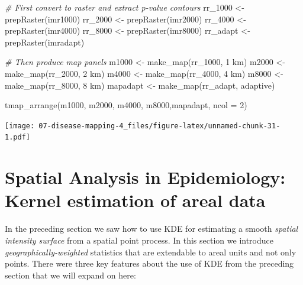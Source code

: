 \documentclass[
]{book}
\newenvironment{Shaded}{\begin{snugshade}}{\end{snugshade}}
\newcommand{\AttributeTok}[1]{\textcolor[rgb]{0.77,0.63,0.00}{#1}}
\newcommand{\CommentTok}[1]{\textcolor[rgb]{0.56,0.35,0.01}{\textit{#1}}}
\newcommand{\DecValTok}[1]{\textcolor[rgb]{0.00,0.00,0.81}{#1}}
\newcommand{\FunctionTok}[1]{\textcolor[rgb]{0.00,0.00,0.00}{#1}}
\newcommand{\NormalTok}[1]{#1}
\newcommand{\OtherTok}[1]{\textcolor[rgb]{0.56,0.35,0.01}{#1}}
\newcommand{\StringTok}[1]{\textcolor[rgb]{0.31,0.60,0.02}{#1}}
\begin{document}
\begin{Shaded}
\begin{Highlighting}[]
\CommentTok{\# First convert to raster and extract p{-}value contours}
\NormalTok{rr\_1000 }\OtherTok{\textless{}{-}} \FunctionTok{prepRaster}\NormalTok{(imr1000)}
\NormalTok{rr\_2000 }\OtherTok{\textless{}{-}} \FunctionTok{prepRaster}\NormalTok{(imr2000)}
\NormalTok{rr\_4000 }\OtherTok{\textless{}{-}} \FunctionTok{prepRaster}\NormalTok{(imr4000)}
\NormalTok{rr\_8000 }\OtherTok{\textless{}{-}} \FunctionTok{prepRaster}\NormalTok{(imr8000)}
\NormalTok{rr\_adapt }\OtherTok{\textless{}{-}} \FunctionTok{prepRaster}\NormalTok{(imradapt)}

\CommentTok{\# Then produce map panels}
\NormalTok{m1000 }\OtherTok{\textless{}{-}} \FunctionTok{make\_map}\NormalTok{(rr\_1000, }\StringTok{\textquotesingle{}1 km\textquotesingle{}}\NormalTok{)}
\NormalTok{m2000 }\OtherTok{\textless{}{-}} \FunctionTok{make\_map}\NormalTok{(rr\_2000, }\StringTok{\textquotesingle{}2 km\textquotesingle{}}\NormalTok{)}
\NormalTok{m4000 }\OtherTok{\textless{}{-}} \FunctionTok{make\_map}\NormalTok{(rr\_4000, }\StringTok{\textquotesingle{}4 km\textquotesingle{}}\NormalTok{)}
\NormalTok{m8000 }\OtherTok{\textless{}{-}} \FunctionTok{make\_map}\NormalTok{(rr\_8000, }\StringTok{\textquotesingle{}8 km\textquotesingle{}}\NormalTok{)}
\NormalTok{mapadapt }\OtherTok{\textless{}{-}} \FunctionTok{make\_map}\NormalTok{(rr\_adapt, }\StringTok{\textquotesingle{}adaptive\textquotesingle{}}\NormalTok{)}

\FunctionTok{tmap\_arrange}\NormalTok{(m1000, m2000, m4000, m8000,mapadapt, }\AttributeTok{ncol =} \DecValTok{2}\NormalTok{)}
\end{Highlighting}
\end{Shaded}

\texttt{[image: 07-disease-mapping-4\_files/figure-latex/unnamed-chunk-31-1.pdf]}

\hypertarget{gwss}{%
\section{Spatial Analysis in Epidemiology: Kernel estimation of areal data}\label{gwss}}

In the preceding section we saw how to use KDE for estimating a smooth \emph{spatial intensity surface} from a spatial point process. In this section we introduce \emph{geographically-weighted} statistics that are extendable to areal units and not only points. There were three key features about the use of KDE from the preceding section that we will expand on here:
\end{document}
